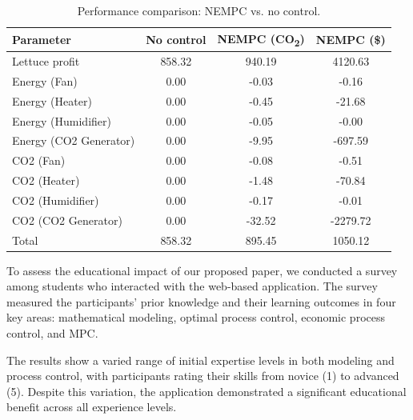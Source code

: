 \documentclass[conference]{IEEEtran}
\begin{document}
\begin{table}
    \centering
    \caption{Performance comparison: NEMPC {vs. } no control.}\label{tab:comparison}
    \begin{tabular}{lS[table-format=4.2]S[table-format=4.2]S[table-format=4.2]}
        \toprule
        Parameter              & {No control} & {NEMPC (CO\textsubscript{2})} & {NEMPC (\$)} \\
        \midrule
        Lettuce profit         & 858.32       & 940.19                        & 4120.63      \\
        Energy (Fan)           & 0.00         & -0.03                         & -0.16        \\
        Energy (Heater)        & 0.00         & -0.45                         & -21.68       \\
        Energy (Humidifier)    & 0.00         & -0.05                         & -0.00        \\
        Energy (CO2 Generator) & 0.00         & -9.95                         & -697.59      \\
        CO2 (Fan)              & 0.00         & -0.08                         & -0.51        \\
        CO2 (Heater)           & 0.00         & -1.48                         & -70.84       \\
        CO2 (Humidifier)       & 0.00         & -0.17                         & -0.01        \\
        CO2 (CO2 Generator)    & 0.00         & -32.52                        & -2279.72     \\
        \midrule
        Total                  & 858.32       & 895.45                        & 1050.12      \\
        \bottomrule
    \end{tabular}
\end{table}

To assess the educational impact of our proposed paper, we conducted a survey among students who interacted with the web-based application. The survey measured the participants' prior knowledge and their learning outcomes in four key areas: mathematical modeling, optimal process control, economic process control, and MPC.

The results show a varied range of initial expertise levels in both modeling and process control, with participants rating their skills from novice (1) to advanced (5). Despite this variation, the application demonstrated a significant educational benefit across all experience levels.
\end{document}
